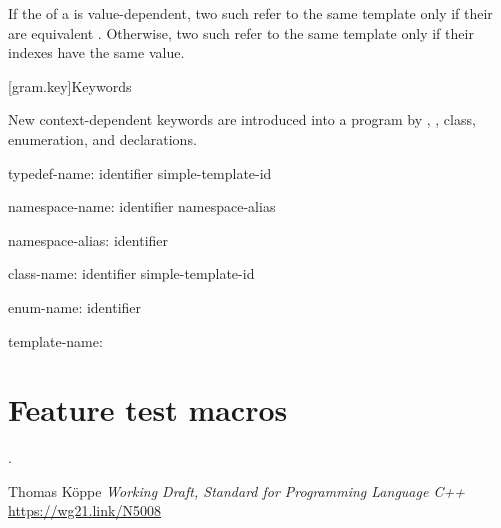 \documentclass{wg21}
\begin{document}
\begin{addedblock}
If the  of a 
is value-dependent,
two such  refer to the same template
only if their  are equivalent .
Otherwise, two such  refer to the same template
only if their indexes have the same value.
\end{addedblock}



[gram.key]{Keywords}

\pnum
{}%
New context-dependent keywords are introduced into a program by
,
,
class, enumeration, and
declarations.

\begin{ncbnf}
    typedef-name:\br
    identifier\br
    simple-template-id
\end{ncbnf}

\begin{ncbnf}
    namespace-name:\br
    identifier\br
    namespace-alias
\end{ncbnf}

\begin{ncbnf}
    namespace-alias:\br
    identifier
\end{ncbnf}

\begin{ncbnf}
    class-name:\br
    identifier\br
    simple-template-id
\end{ncbnf}

\begin{ncbnf}
    enum-name:\br
    identifier
\end{ncbnf}

\begin{ncbnf}
    template-name:\br
     \br
    \br
\end{ncbnf}


\section{Feature test macros}

.


\renewcommand{\section}[2]{}%



\begin{thebibliography}{9}

Thomas Köppe
\emph{Working Draft, Standard for Programming Language C++}\newline
\url{https://wg21.link/N5008}


\end{thebibliography}
\end{document}

